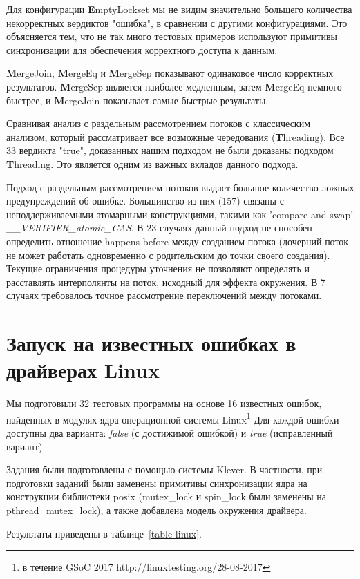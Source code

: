 Для конфигурации {\textbf EmptyLockset} мы не видим значительно большего количества некорректных вердиктов "ошибка", в сравнении с  другими конфигурациями.
Это объясняется тем, что не так много тестовых примеров используют примитивы синхронизации для обеспечения корректного доступа к данным.

{\textbf MergeJoin}, {\textbf MergeEq} и {\textbf MergeSep} показывают одинаковое число корректных результатов.
{\textbf MergeSep} является наиболее медленным, затем {\textbf MergeEq} немного быстрее, и {\textbf MergeJoin} показывает самые быстрые результаты.

Сравнивая анализ с раздельным рассмотрением потоков с классическим анализом, который рассматривает все возможные чередования ({\textbf Threading}).
Все 33 вердикта "true", доказанных нашим подходом не были доказаны подходом {\textbf Threading}.
Это является одним из важных вкладов данного подхода. 

Подход с раздельным рассмотрением потоков выдает большое количество ложных предупреждений об ошибке. 
Большинство из них (157) связаны с неподдерживаемыми атомарными конструкциями, такими как 'compare and swap' {\em \_\_VERIFIER\_atomic\_CAS}.
В 23 случаях данный подход не способен определить отношение happens-before между созданием потока (дочерний поток не может работать одновременно с родительским до точки своего создания).
Текущие ограничения процедуры уточнения не позволяют определять и расставлять интерполянты на поток, исходный для эффекта окружения.
В 7 случаях требовалось точное рассмотрение переключений между потоками.

\section{Запуск на известных ошибках в драйверах Linux}
Мы подготовили 32 тестовых программы на основе 16 известных ошибок, найденных в модулях ядра операционной системы Linux\footnote{в течение GSoC 2017 http://linuxtesting.org/28-08-2017}
Для каждой ошибки доступны два варианта: {\em false} (с достижимой ошибкой) и {\em true} (исправленный вариант).

Задания были подготовлены с помощью системы Klever. В частности, при подготовки заданий были заменены примитивы синхронизации ядра на конструкции библиотеки posix (mutex\_lock и spin\_lock были заменены на pthread\_mutex\_lock), а также добавлена модель окружения драйвера.

Результаты приведены в таблице~\ref{table-linux}.

